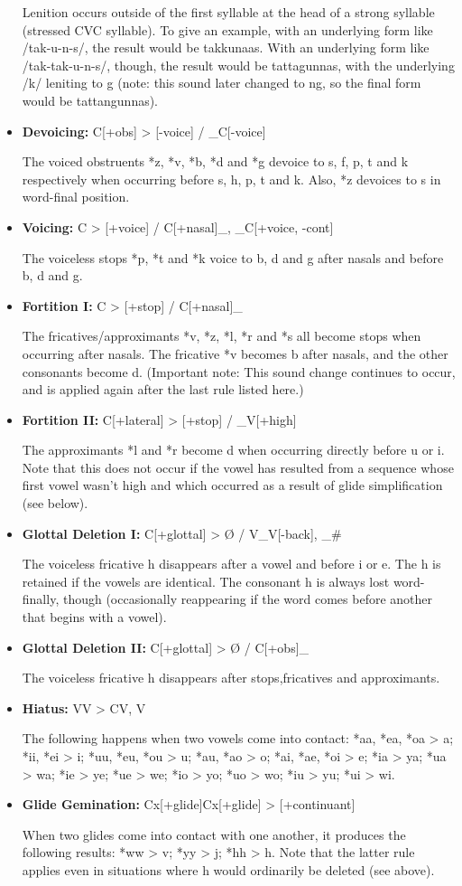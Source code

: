 \begin{itemize}
Lenition occurs outside of the first syllable at the head of a strong syllable (stressed CVC syllable).
To give an example, with an underlying form like /tak-u-n-s/, the result would be takkunaas.
With an underlying form like /tak-tak-u-n-s/, though, the result would be tattagunnas, with the underlying /k/ leniting to g (note: this sound later changed to ng, so the final form would be tattangunnas).
\item
\textbf{Devoicing:}
C[+obs] > [-voice] / \_C[-voice]

The voiced obstruents *z, *v, *b, *d and *g devoice to s, f, p, t and k respectively when occurring before s, h, p, t and k.
Also, *z devoices to s in word-final position.
\item
\textbf{Voicing:}
C > [+voice] / C[+nasal]\_, \_C[+voice, -cont]

The voiceless stops *p, *t and *k voice to b, d and g after nasals and before b, d and g.
\item
\textbf{Fortition I:}
C > [+stop] / C[+nasal]\_

The fricatives/approximants *v, *z, *l, *r and *s all become stops when occurring after nasals.
The fricative *v becomes b after nasals, and the other consonants become d.
(Important note: This sound change continues to occur, and is applied again after the last rule listed here.)
\item
\textbf{Fortition II:}
C[+lateral] > [+stop] / \_V[+high]

The approximants *l and *r become d when occurring directly before u or i.
Note that this does not occur if the vowel has resulted from a sequence whose first vowel wasn't high and which occurred as a result of glide simplification (see below).
\item
\textbf{Glottal Deletion I:}
C[+glottal] > Ø / V\_V[-back], \_\#

The voiceless fricative h disappears after a vowel and before i or e.
The h is retained if the vowels are identical.
The consonant h is always lost word-finally, though (occasionally reappearing if the word comes before another that begins with a vowel).
\item
\textbf{Glottal Deletion II:}
C[+glottal] > Ø / C[+obs]\_

The voiceless fricative h disappears after stops,fricatives and approximants.
\item
\textbf{Hiatus:}
VV > CV, V

The following happens when two vowels come into contact:
*aa, *ea, *oa > a; *ii, *ei > i; *uu, *eu, *ou > u; *au, *ao > o; *ai, *ae, *oi > e; *ia > ya; *ua > wa; *ie > ye; *ue > we; *io > yo; *uo > wo; *iu > yu; *ui > wi.
\item
\textbf{Glide Gemination:}
Cx[+glide]Cx[+glide] > [+continuant]

When two glides come into contact with one another, it produces the following results:
*ww > v; *yy > j; *hh > h.
Note that the latter rule applies even in situations where h would ordinarily be deleted (see above).
\end{itemize}

